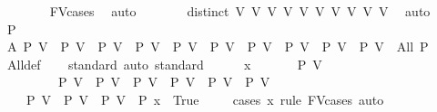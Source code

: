 \begin{isabellebody}
\ \ \ \ \ \ \isamarkupfalse%
\ FV{\isacharunderscore}{\kern0pt}cases\ \isamarkupfalse%
\ auto\isanewline
\ \ \isamarkupfalse%
\isanewline
\ \ \isamarkupfalse%
\ {\isachardoublequoteopen}\ distinct\ {\isacharbrackleft}{\kern0pt}V{}{\isacharcomma}{\kern0pt}\ V{}{\isacharcomma}{\kern0pt}\ V{}{\isacharcomma}{\kern0pt}\ V{}{\isacharcomma}{\kern0pt}\ V{}{\isacharcomma}{\kern0pt}\ V{}{\isacharcomma}{\kern0pt}\ V{}{\isacharcomma}{\kern0pt}\ V{}{\isacharcomma}{\kern0pt}\ V{}{\isacharcomma}{\kern0pt}\ V{}{}{\isacharbrackright}{\kern0pt}{\isachardoublequoteclose}\ \isamarkupfalse%
\ auto\isanewline
\ \ \isamarkupfalse%
\ P\ \isanewline
\ \ \isamarkupfalse%
\ A{\isacharcolon}{\kern0pt}\ {\isachardoublequoteopen}{\isacharparenleft}{\kern0pt}P\ V{}\ {\isasymand}\ P\ V{}\ {\isasymand}\ P\ V{}\ {\isasymand}\ P\ V{}\ {\isasymand}\ P\ V{}\ {\isasymand}\ P\ V{}\ {\isasymand}\ P\ V{}\ {\isasymand}\ P\ V{}\ {\isasymand}\ P\ V{}\ {\isasymand}\ P\ V{}{}{\isacharparenright}{\kern0pt}\ {\isacharequal}{\kern0pt}\ All\ P{\isachardoublequoteclose}\isanewline
\ \ \ \ \isamarkupfalse%
\ All{\isacharunderscore}{\kern0pt}def\ \isanewline
\ \ \isamarkupfalse%
{\isacharparenleft}{\kern0pt}standard{\isacharcomma}{\kern0pt}\ auto{\isacharcomma}{\kern0pt}\ standard{\isacharparenright}{\kern0pt}\isanewline
\ \ \ \ \isamarkupfalse%
\ x\ \isanewline
\ \ \ \ \isamarkupfalse%
\ {\isachardoublequoteopen}P\ V{}\ {\isasymLongrightarrow}\isanewline
\ \ \ \ \ \ \ \ \ P\ V{}\ {\isasymLongrightarrow}\ P\ V{}\ {\isasymLongrightarrow}\ P\ V{}\ {\isasymLongrightarrow}\ P\ V{}\ {\isasymLongrightarrow}\ P\ V{}\ {\isasymLongrightarrow}\ P\ V{}\ {\isasymLongrightarrow}\ \isanewline
\ \ \ \ P\ V{}\ {\isasymLongrightarrow}\ P\ V{}\ {\isasymLongrightarrow}\ P\ V{}{}\ {\isasymLongrightarrow}\ P\ x\ {\isacharequal}{\kern0pt}\ True{\isachardoublequoteclose}\isanewline
\ \ \ \ \isamarkupfalse%
{\isacharparenleft}{\kern0pt}cases\ x\ rule{\isacharcolon}{\kern0pt}\ FV{\isacharunderscore}{\kern0pt}cases{\isacharcomma}{\kern0pt}\ auto{\isacharparenright}{\kern0pt}\ \isamarkupfalse%

\end{isabellebody}
